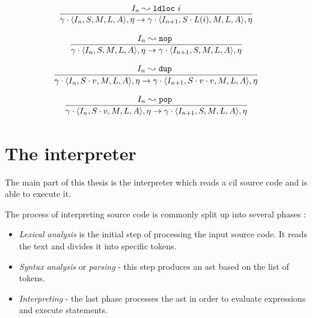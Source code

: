\documentclass{article}
\numberwithin{equation}{section}
\newcommand{\mstate}[5] {
	\langle#1, #2, #3, #4, #5\rangle
}
\newcommand{\ipointsto}[3] {
	#1 \leadsto \texttt{#2} \text{ } #3
}
\begin{document}
\begin{equation}
\label{eq:semantics_ldloc}
	\infer{
		\gamma \cdot \mstate{I_n}{S}{M}{L}{A}, \eta
			\rightarrow
		\gamma \cdot \mstate{I_{n+1}}{S \cdot L(i)}{M}{L}{A}, \eta
	}
	{\ipointsto{I_n}{ldloc}{i}}
\end{equation}

\begin{equation}
\label{eq:semantics_nop}
	\infer{
		\gamma \cdot \mstate{I_n}{S}{M}{L}{A}, \eta
			\rightarrow
		\gamma \cdot \mstate{I_{n+1}}{S}{M}{L}{A}, \eta
	}
	{\ipointsto{I_n}{nop}}
\end{equation}

\begin{equation}
\label{eq:semantics_dup}
	\infer{
		\gamma \cdot \mstate{I_n}{S \cdot v}{M}{L}{A}, \eta
			\rightarrow
		\gamma \cdot \mstate{I_{n+1}}{S \cdot v \cdot v}{M}{L}{A}, \eta
	}
	{\ipointsto{I_n}{dup}}
\end{equation}

\begin{equation}
\label{eq:semantics_pop}
	\infer{
		\gamma \cdot \mstate{I_n}{S \cdot v}{M}{L}{A}, \eta
			\rightarrow
		\gamma \cdot \mstate{I_{n+1}}{S}{M}{L}{A}, \eta
	}
	{\ipointsto{I_n}{pop}}
\end{equation}

\clearpage


\section{The interpreter}

The main part of this thesis is the interpreter which reads a \acrshort{cil} source code and is able to execute it.

The process of interpreting source code is commonly split up into several phases \cite{compilerDesign}:
\begin{itemize}
	\item{\textit{Lexical analysis} is the initial step of processing the input source code. It reads the text and divides it into specific tokens.}
	\item{\textit{Syntax analysis} or \textit{parsing} - this step produces an \acrshort{ast} based on the list of tokens.}
	\item{\textit{Interpreting} - the last phase processes the \acrshort{ast} in order to evaluate expressions and execute statements.}
\end{itemize}
\end{document}
